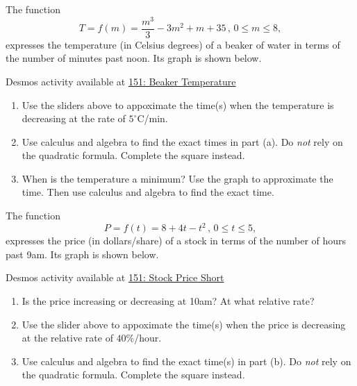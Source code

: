 \documentclass{ximera}
\begin{document}
\begin{question} \label{QLKDFeedddede}

The function 
\[
  T = f(m) = \frac{m^{3}}{3}-3m^{2}+m+35 \, , \, 0\leq m \leq 8 ,
\]
expresses the temperature (in Celsius degrees) of a beaker of water in terms of the number of minutes past noon. Its graph is shown below.

\begin{onlineOnly}
    \begin{center}
\end{center}
\end{onlineOnly}

Desmos activity available at
\href{https://www.desmos.com/calculator/jrzsv06pwt}{151: Beaker Temperature}

\begin{enumerate}
\item Use the sliders above to appoximate the time(s) when the temperature is decreasing at the rate of $5^\circ$C/min.

\item Use calculus and algebra to find the exact times in part (a). Do \emph{not} rely on the quadratic formula. Complete the square instead.

\item When is the temperature a minimum? Use the graph to approximate the time. Then use calculus and algebra to find the exact time.
\end{enumerate}
\end{question}


\begin{question} \label{Q9efrlerdsfsf}
The function
\[
     P = f(t) = 8+4t-t^2 \, , \, 0\leq t \leq 5 ,
\]
expresses the price (in dollars/share) of a stock in terms of the number of hours past 9am. Its graph is shown below.

\begin{onlineOnly}
    \begin{center}
\end{center}
\end{onlineOnly}

Desmos activity available at
\href{https://www.desmos.com/calculator/jrwe6t0x41}{151: Stock Price Short}

\begin{enumerate}
\item Is the price increasing or decreasing at 10am? At what relative rate? 

\item Use the slider above to appoximate the time(s) when the price is decreasing at the relative rate of $40\%$/hour.

\item Use calculus and algebra to find the exact time(s) in part (b). Do \emph{not} rely on the quadratic formula. Complete the square instead.
\end{enumerate}
\end{question}
\end{document}
